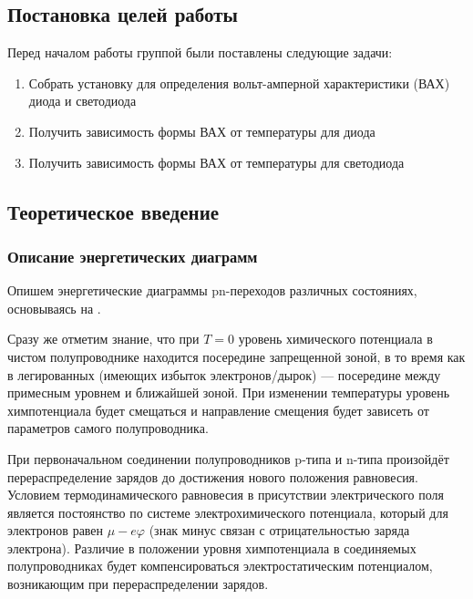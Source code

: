 \documentclass[a4paper, 12pt]{article}
\renewcommand{\phi}{\varphi} %
\begin{document}
\subsection{Постановка целей работы}

Перед началом работы группой были поставлены следующие задачи:

\begin{enumerate}
	\item Собрать установку для определения вольт-амперной характеристики (ВАХ) диода и светодиода
	
	\item Получить зависимость формы ВАХ от температуры для диода
	
	\item Получить зависимость формы ВАХ от температуры для светодиода
\end{enumerate}

\subsection{Теоретическое введение}

\subsubsection{Описание энергетических диаграмм}

Опишем энергетические диаграммы pn-переходов различных состояниях, основываясь на \cite{Glazkov}.

Сразу же отметим знание, что при $T = 0$ уровень химического потенциала в чистом полупроводнике находится посередине запрещенной зоной, в то время как в легированных (имеющих избыток электронов/дырок) --- посередине между примесным уровнем и ближайшей зоной. При изменении температуры уровень химпотенциала будет смещаться и направление смещения будет зависеть от параметров самого полупроводника.

При первоначальном соединении полупроводников p-типа и n-типа произойдёт перераспределение зарядов до достижения нового положения равновесия. Условием термодинамического равновесия в присутствии электрического поля является постоянство по системе электрохимического потенциала, который для электронов равен $\mu - e \phi$ (знак минус связан с отрицательностью заряда электрона). Различие в положении уровня химпотенциала в соединяемых полупроводниках будет компенсироваться электростатическим потенциалом, возникающим при перераспределении зарядов.
\end{document}
